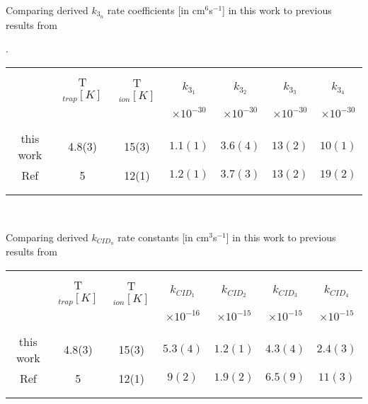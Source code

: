 \begin{threeparttable}[!htb]
    \centering
    \caption{Comparing derived $k_{3_n}$ rate coefficients [in cm$^6$s$^{-1}$] in this work to previous results from \citet{Brunken2017}}. 
     \begin{tabular}{ccccccc}
        \hline\\
        & T$_{trap} [K]$ & T$_{ion} [K]$& $k_{3_1}$ &  $k_{3_2}$ & $k_{3_3}$ & $k_{3_4}$ \\
        &&& $\times 10^{-30}$ & $\times 10^{-30}$ & $\times 10^{-30}$ & $\times 10^{-30}$\\
        \\\hline\hline\\
        this work & 4.8(3) & 15(3) & $1.1(1)$ & $3.6(4)$ & $13(2)$ & $10(1)$ \\
        Ref \cite{Brunken2017} & 5 & 12(1) & $1.2(1)$ & $3.7(3)$ & $13(2)$ & $19(2)$ \\
        \\\hline\hline\\
    \end{tabular}
    \label{tab:k3:rate-constants}
\end{threeparttable}
\\

\begin{threeparttable}[!htb]
    \centering
    \caption{Comparing derived  $k_{CID_n}$ rate constants [in cm$^3$s$^{-1}$] in this work to previous results from \citet{Brunken2017}}
    \begin{tabular}{ccccccc}
        \hline\\
        & T$_{trap} [K]$ & T$_{ion} [K]$& $k_{CID_1}$ &  $k_{CID_2}$ & $k_{CID_3}$ & $k_{CID_4}$ \\
        &&& $\times 10^{-16}$ & $\times 10^{-15}$ & $\times 10^{-15}$ & $\times 10^{-15}$\\
        \\\hline\hline\\
        this work & 4.8(3) &  15(3) & $5.3(4)$ & $1.2(1)$ & $4.3(4)$ & $2.4(3)$ \\
        Ref \cite{Brunken2017} & 5 & 12(1) & $9(2)$ & $1.9(2)$ & $6.5(9)$ & $11(3)$ \\
        \\\hline\hline\\
    \end{tabular}
    \label{tab:kCID:rate-constants}
\end{threeparttable}
